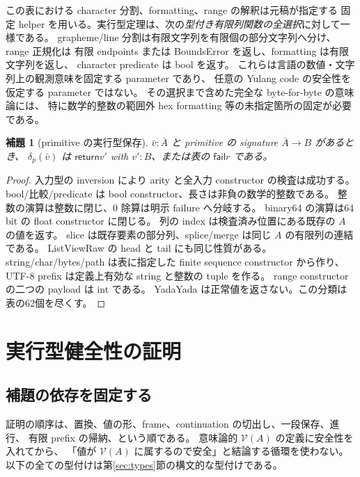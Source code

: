 \documentclass[11pt,a4paper]{article}
\newtheorem{lemma}[definition]{補題}
\newcommand{\Ret}{\mathsf{return}}
\newcommand{\Fail}{\mathsf{fail}}
\newcommand{\V}{\mathcal V}
\begin{document}
この表における character 分割、formatting、range の解釈は元稿が指定する
固定 helper を用いる。実行型定理は、次の\emph{型付き有限列関数の全選択}に対して一様である。
grapheme/line 分割は有限文字列を有限個の部分文字列へ分け、range 正規化は
有限 endpoints または BoundsError を返し、formatting は有限文字列を返し、
character predicate は bool を返す。
これらは言語の数値・文字列上の観測意味を固定する parameter であり、
任意の Yulang code の安全性を仮定する parameter ではない。
その選択まで含めた完全な byte-for-byte の意味論には、
特に数学的整数の範囲外 hex formatting 等の未指定箇所の固定が必要である。

\begin{lemma}[primitive の実行型保存]
\(\bar v:\bar A\) と primitive の signature \(\bar A\to B\) があるとき、
\(\delta_p(\bar v)\) は \(\Ret v'\) with \(v':B\)、または表の \(\Fail r\) である。
\end{lemma}
\begin{proof}
入力型の inversion により arity と全入力 constructor の検査は成功する。
bool/比較/predicate は bool constructor、長さは非負の数学的整数である。
整数の演算は整数に閉じ、0 除算は明示 failure へ分岐する。
binary64 の演算は64 bit の float constructor に閉じる。
列の index は検査済み位置にある既存の \(A\) の値を返す。
slice は既存要素の部分列、splice/merge は同じ \(A\) の有限列の連結である。
ListViewRaw の head と tail にも同じ性質がある。
string/char/bytes/path は表に指定した finite sequence constructor から作り、
UTF-8 prefix は定義上有効な string と整数の tuple を作る。
range constructor の二つの payload は int である。
YadaYada は正常値を返さない。この分類は表の62個を尽くす。
\end{proof}

\section{実行型健全性の証明}
\label{sec:proof}

\subsection{補題の依存を固定する}

証明の順序は、置換、値の形、frame、continuation の切出し、一段保存、進行、
有限 prefix の帰納、という順である。
意味論的 \(\V(A)\) の定義に安全性を入れてから、
「値が \(\V(A)\) に属するので安全」と結論する循環を使わない。
以下の全ての型付けは第\ref{sec:types}節の構文的な型付けである。
\end{document}
